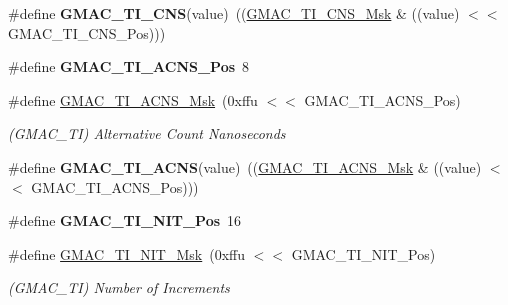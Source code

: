 \begin{DoxyCompactItemize}
\mbox{\label{group__SAME70__GMAC_ga3b252c6665596aed68983009c4e88be4}} 
\#define {\bfseries G\+M\+A\+C\+\_\+\+T\+I\+\_\+\+C\+NS}(value)~((\mbox{\hyperlink{group__SAMV71__GMAC_gade1be71165e92b0b8d5e29e773099cb7}{G\+M\+A\+C\+\_\+\+T\+I\+\_\+\+C\+N\+S\+\_\+\+Msk}} \& ((value) $<$$<$ G\+M\+A\+C\+\_\+\+T\+I\+\_\+\+C\+N\+S\+\_\+\+Pos)))
\item 
\mbox{\label{group__SAME70__GMAC_ga7ca791509992318de5abf6a9a0688986}} 
\#define {\bfseries G\+M\+A\+C\+\_\+\+T\+I\+\_\+\+A\+C\+N\+S\+\_\+\+Pos}~8
\item 
\mbox{\label{group__SAME70__GMAC_gac7156a46ba790d05ff6b61bf5e0ca0b3}} 
\#define \mbox{\hyperlink{group__SAME70__GMAC_gac7156a46ba790d05ff6b61bf5e0ca0b3}{G\+M\+A\+C\+\_\+\+T\+I\+\_\+\+A\+C\+N\+S\+\_\+\+Msk}}~(0xffu $<$$<$ G\+M\+A\+C\+\_\+\+T\+I\+\_\+\+A\+C\+N\+S\+\_\+\+Pos)
\begin{DoxyCompactList}\small\item\em (G\+M\+A\+C\+\_\+\+TI) Alternative Count Nanoseconds \end{DoxyCompactList}\item 
\mbox{\label{group__SAME70__GMAC_ga87d3274302ddd3acbf2492825ca2b585}} 
\#define {\bfseries G\+M\+A\+C\+\_\+\+T\+I\+\_\+\+A\+C\+NS}(value)~((\mbox{\hyperlink{group__SAMV71__GMAC_gac7156a46ba790d05ff6b61bf5e0ca0b3}{G\+M\+A\+C\+\_\+\+T\+I\+\_\+\+A\+C\+N\+S\+\_\+\+Msk}} \& ((value) $<$$<$ G\+M\+A\+C\+\_\+\+T\+I\+\_\+\+A\+C\+N\+S\+\_\+\+Pos)))
\item 
\mbox{\label{group__SAME70__GMAC_gac1497c8ae4bafee49fb04beba1aafb25}} 
\#define {\bfseries G\+M\+A\+C\+\_\+\+T\+I\+\_\+\+N\+I\+T\+\_\+\+Pos}~16
\item 
\mbox{\label{group__SAME70__GMAC_ga1c6cb02b42ee579c5ca8228e382a5414}} 
\#define \mbox{\hyperlink{group__SAME70__GMAC_ga1c6cb02b42ee579c5ca8228e382a5414}{G\+M\+A\+C\+\_\+\+T\+I\+\_\+\+N\+I\+T\+\_\+\+Msk}}~(0xffu $<$$<$ G\+M\+A\+C\+\_\+\+T\+I\+\_\+\+N\+I\+T\+\_\+\+Pos)
\begin{DoxyCompactList}\small\item\em (G\+M\+A\+C\+\_\+\+TI) Number of Increments \end{DoxyCompactList}\item 

\end{DoxyCompactItemize}

